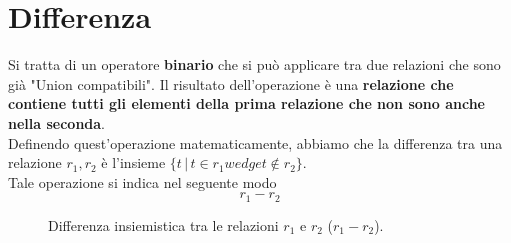 \documentclass[12pt]{report}
\begin{document}
	\section{Differenza}
	Si tratta di un operatore \textbf{binario} che si può applicare tra due relazioni che sono già "Union compatibili". Il risultato dell'operazione è una \textbf{relazione che contiene tutti gli elementi della prima relazione che non sono anche nella seconda}.\\
	Definendo quest'operazione matematicamente, abbiamo che la differenza tra una relazione $r_1, r_2$ è l'insieme $\{t \, |\, t \in r_1 wedge t \notin r_2\}$.\\
	Tale operazione si indica nel seguente modo
	\[
		r_1 - r_2
	\]
	\begin{figure}[htbp]
		\centering
		\caption{Differenza insiemistica tra le relazioni $r_1$ e $r_2$ ($r_1 - r_2$).}
		\label{fig:differenza_relazioni}
	\end{figure}
	
\end{document}
